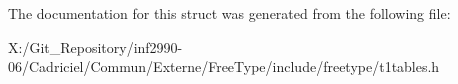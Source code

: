 The documentation for this struct was generated from the following file\-:\begin{DoxyCompactItemize}
\item 
X\-:/\-Git\-\_\-\-Repository/inf2990-\/06/\-Cadriciel/\-Commun/\-Externe/\-Free\-Type/include/freetype/t1tables.\-h\end{DoxyCompactItemize}
